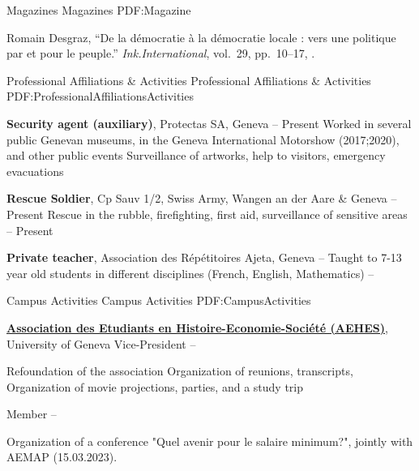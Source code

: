 \documentclass[letterpaper,MMMyyyy,nonstopmode]{simpleresumecv}
\begin{document}
\begin{Body}
\SubSection
{Magazines}
{Magazines}
{PDF:Magazine}

\begingroup
\renewcommand{\MaxNumberedItem}{[88]}

\BigGap
{Romain Desgraz,
``De la démocratie à la démocratie locale : vers une politique par et pour le peuple.''
\textit{Ink.International},
vol.~29,
pp.~10--17,
.}


\endgroup


\Section
{Professional Affiliations\newline
\& Activities}
{Professional Affiliations \& Activities}
{PDF:ProfessionalAffiliationsActivities}

\Entry
\textbf{Security agent (auxiliary)}, Protectas SA, Geneva
\hfill
{} --
Present
\BulletItem
Worked in several public Genevan museums, in the Geneva International Motorshow (2017;2020), and other public events 
\BulletItem
Surveillance of artworks, help to visitors, emergency evacuations

\BigGap
\Entry
\textbf{Rescue Soldier}, Cp Sauv 1/2, Swiss Army, Wangen an der Aare \& Geneva
 --
Present
\BulletItem
Rescue in the rubble, firefighting, first aid, surveillance of sensitive areas
\hfill
{} --
Present

\BigGap
\Entry
\textbf{Private teacher}, Association des Répétitoires Ajeta, Geneva
\hfill
{} -- 
\BulletItem
Taught to 7-13 year old students in different disciplines (French, English, Mathematics)
\hfill
{} -- 



\Section
{Campus Activities}
{Campus Activities}
{PDF:CampusActivities}

\Entry
\href{https://agora.unige.ch/associations/AEHES}
{\textbf{Association des Etudiants en Histoire-Economie-Société (AEHES)}},
University of Geneva
\Gap
\BulletItem
Vice-President
\hfill
{} --
\begin{Detail}
\SubBulletItem
Refoundation of the association
\SubBulletItem
Organization of reunions, transcripts, 
\SubBulletItem
Organization of movie projections, parties, and a study trip
\end{Detail}
\BigGap
\BulletItem
Member
\hfill
{} --
\begin{Detail}
\SubBulletItem
Organization of a conference "Quel avenir pour le salaire minimum?", jointly with AEMAP (15.03.2023). 


\end{Detail}
\end{Body}
\end{document}
